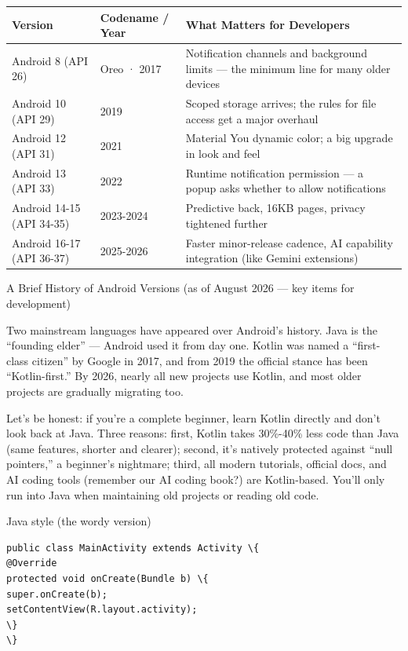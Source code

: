 \begin{center}
\begin{tabularx}{\linewidth}{|X|X|X|}
\hline
\textbf{Version} & \textbf{Codename / Year} & \textbf{What Matters for Developers} \tabularnewline
\hline
Android 8 (API 26) & Oreo · 2017 & Notification channels and background limits — the minimum line for many older devices \tabularnewline
Android 10 (API 29) & 2019 & Scoped storage arrives; the rules for file access get a major overhaul \tabularnewline
Android 12 (API 31) & 2021 & Material You dynamic color; a big upgrade in look and feel \tabularnewline
Android 13 (API 33) & 2022 & Runtime notification permission — a popup asks whether to allow notifications \tabularnewline
Android 14-15 (API 34-35) & 2023-2024 & Predictive back, 16KB pages, privacy tightened further \tabularnewline
Android 16-17 (API 36-37) & 2025-2026 & Faster minor-release cadence, AI capability integration (like Gemini extensions) \tabularnewline
\hline
\end{tabularx}
\end{center}

\begin{center}\small\color{gray}A Brief History of Android Versions (as of August 2026 — key items for development)\end{center}


Two mainstream languages have appeared over Android's history. Java is the “founding elder” — Android used it from day one. Kotlin was named a “first-class citizen” by Google in 2017, and from 2019 the official stance has been “Kotlin-first.” By 2026, nearly all new projects use Kotlin, and most older projects are gradually migrating too.

Let's be honest: if you're a complete beginner, learn Kotlin directly and don't look back at Java. Three reasons: first, Kotlin takes 30\%-40\% less code than Java (same features, shorter and clearer); second, it's natively protected against “null pointers,” a beginner's nightmare; third, all modern tutorials, official docs, and AI coding tools (remember our AI coding book?) are Kotlin-based. You'll only run into Java when maintaining old projects or reading old code.

Java style (the wordy version)

\begin{lstlisting}
public class MainActivity extends Activity \{
@Override
protected void onCreate(Bundle b) \{
super.onCreate(b);
setContentView(R.layout.activity);
\}
\}
\end{lstlisting}

